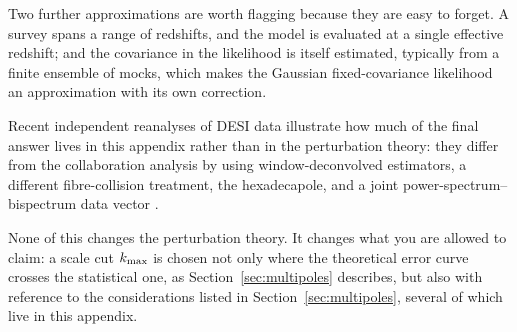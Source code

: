 \documentclass[a4paper,11pt]{article}
\numberwithin{equation}{section}
\begin{document}
Two further approximations are worth flagging because they are easy to forget.
A survey spans a range of redshifts, and the model is evaluated at a single
effective redshift; and the covariance in the likelihood is itself estimated,
typically from a finite ensemble of mocks, which makes the Gaussian
fixed-covariance likelihood an approximation with its own correction.

Recent independent reanalyses of DESI data illustrate how much of the final
answer lives in this appendix rather than in the perturbation theory: they
differ from the collaboration analysis by using window-deconvolved estimators,
a different fibre-collision treatment, the hexadecapole, and a joint
power-spectrum--bispectrum data vector \cite{Chudaykin2025}.

None of this changes the perturbation theory. It changes what you are allowed to
claim: a scale cut $k_{\rm max}$ is chosen not only where the theoretical error
curve crosses the statistical one, as Section~\ref{sec:multipoles} describes,
but also with reference to the considerations listed in
Section~\ref{sec:multipoles}, several of which live in this appendix.
\end{document}
